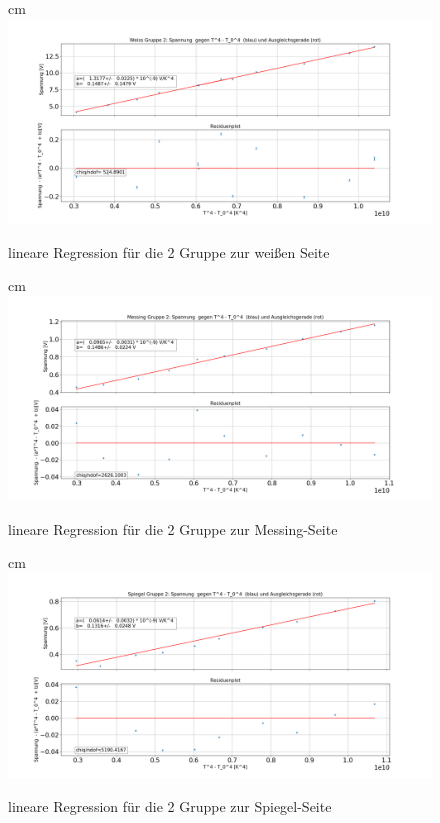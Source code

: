 \documentclass[a4paper, 11pt]{article}
\begin{document}
\begin{center}
\begin{figure}[H]
	 cm
	\includegraphics[scale=0.42]{Bilder/Gruppe2_Weiss.png}%
	\caption[lineare Regression für die 2 Gruppe zur weißen Seite]{lineare Regression für die 2 Gruppe zur weißen Seite}%
	\label{pic:Abbildung 2}%
\end{figure}

\begin{figure}[H]	
	 cm
	\includegraphics[scale=0.42]{Bilder/Gruppe2_Messing.png}%
	\caption[lineare Regression für die 2 Gruppe zur Messing-Seite]{lineare Regression für die 2 Gruppe zur Messing-Seite}%
	\label{pic:Abbildung 2}%
\end{figure}

\begin{figure}[H]
	 cm
	\includegraphics[scale=0.42]{Bilder/Gruppe2_Spiegel.png}%
	\caption[lineare Regression für die 2 Gruppe zur Spiegel-Seite]{lineare Regression für die 2 Gruppe zur Spiegel-Seite}%
	\label{pic:Abbildung 2}%
\end{figure}


\end{center}
\end{document}
